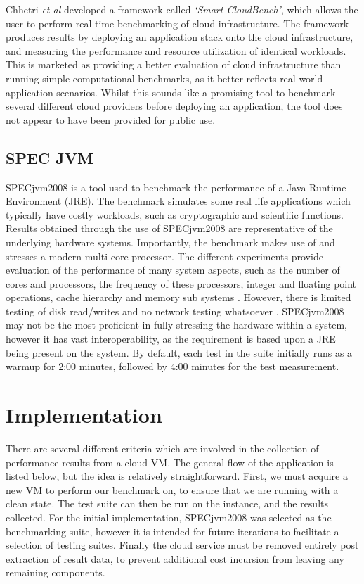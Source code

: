 \documentclass[conference]{IEEEtran}
\begin{document}
Chhetri \textit{et al}\cite{chhetri2013smart} developed a framework called \textit{`Smart CloudBench'}, which allows the user to perform real-time benchmarking of cloud infrastructure. The framework produces results by deploying an application stack onto the cloud infrastructure, and measuring the performance and resource utilization of identical workloads. This is marketed as providing a better evaluation of cloud infrastructure than running simple computational benchmarks, as it better reflects real-world application scenarios. Whilst this sounds like a promising tool to benchmark several different cloud providers before deploying an application, the tool does not appear to have been provided for public use.

\subsection{SPEC JVM}

SPECjvm2008 is a tool used to benchmark the performance of a Java Runtime Environment (JRE). The benchmark simulates some real life applications which typically have costly workloads, such as cryptographic and scientific functions. Results obtained through the use of SPECjvm2008 are representative of the underlying hardware systems. Importantly, the benchmark makes use of and stresses a modern multi-core processor. The different experiments provide evaluation of the performance of many system aspects, such as the number of cores and processors, the frequency of these processors, integer and floating point operations, cache hierarchy and memory sub systems \cite{shiv2009specjvm2008}. However, there is limited testing of disk read/writes and no network testing whatsoever \cite{specjvm}. SPECjvm2008 may not be the most proficient in fully stressing the hardware within a system, however it has vast interoperability, as the requirement is based upon a JRE being present on the system. By default, each test in the suite initially runs as a warmup for 2:00 minutes, followed by 4:00 minutes for the test measurement.


\section{Implementation}\label{sec:implementation}

There are several different criteria which are involved in the collection of performance results from a cloud VM. The general flow of the application is listed below, but the idea is relatively straightforward. First, we must acquire a new VM to perform our benchmark on, to ensure that we are running with a clean state. The test suite can then be run on the instance, and the results collected. For the initial implementation, SPECjvm2008 was selected as the benchmarking suite, however it is intended for future iterations to facilitate a selection of testing suites. Finally the cloud service must be removed entirely post extraction of result data, to prevent additional cost incursion from leaving any remaining components.
\end{document}
